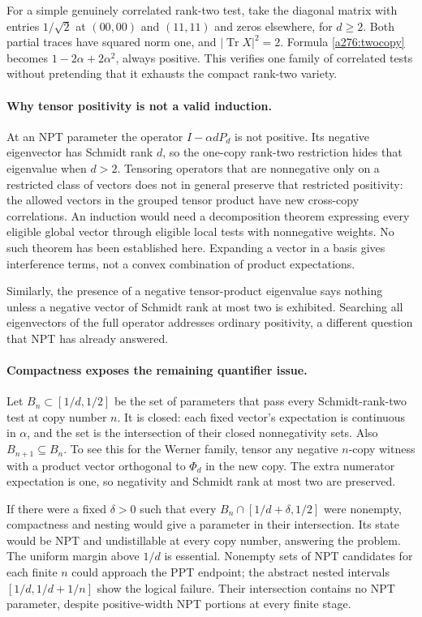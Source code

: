 \documentclass[11pt]{article}
\begin{document}
For a simple genuinely correlated rank-two test, take the diagonal
matrix with entries $1/\sqrt2$ at $(00,00)$ and $(11,11)$ and zeros
elsewhere, for $d\ge2$. Both partial traces have squared norm one,
and $|\operatorname{Tr}X|^2=2$. Formula \eqref{a276:twocopy} becomes
$1-2\alpha+2\alpha^2$, always positive. This verifies one family of
correlated tests without pretending that it exhausts the compact
rank-two variety.

\paragraph{Why tensor positivity is not a valid induction.}
At an NPT parameter the operator $I-\alpha dP_d$ is not positive.
Its negative eigenvector has Schmidt rank $d$, so the one-copy rank-two
restriction hides that eigenvalue when $d>2$. Tensoring operators that
are nonnegative only on a restricted class of vectors does not in
general preserve that restricted positivity: the allowed vectors in
the grouped tensor product have new cross-copy correlations. An
induction would need a decomposition theorem expressing every eligible
global vector through eligible local tests with nonnegative weights.
No such theorem has been established here. Expanding a vector in a
basis gives interference terms, not a convex combination of product
expectations.

Similarly, the presence of a negative tensor-product eigenvalue says
nothing unless a negative vector of Schmidt rank at most two is
exhibited. Searching all eigenvectors of the full operator addresses
ordinary positivity, a different question that NPT has already answered.

\paragraph{Compactness exposes the remaining quantifier issue.}
Let $B_n\subset[1/d,1/2]$ be the set of parameters that pass every
Schmidt-rank-two test at copy number $n$. It is closed: each fixed
vector's expectation is continuous in $\alpha$, and the set is the
intersection of their closed nonnegativity sets. Also
$B_{n+1}\subseteq B_n$. To see this for the Werner family, tensor any
negative $n$-copy witness with a product vector orthogonal to
$\Phi_d$ in the new copy. The extra numerator expectation is one,
so negativity and Schmidt rank at most two are preserved.

If there were a fixed $\delta>0$ such that every
$B_n\cap[1/d+\delta,1/2]$ were nonempty, compactness and nesting would
give a parameter in their intersection. Its state would be NPT and
undistillable at every copy number, answering the problem. The uniform
margin above $1/d$ is essential. Nonempty sets of NPT candidates for
each finite $n$ could approach the PPT endpoint; the abstract nested
intervals $[1/d,1/d+1/n]$ show the logical failure. Their intersection
contains no NPT parameter, despite positive-width NPT portions at
every finite stage.
\end{document}
